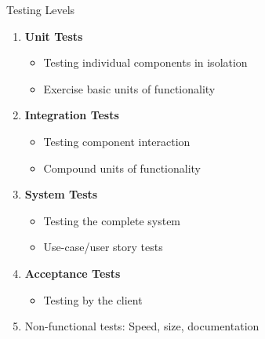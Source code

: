 \begin{frame}{Testing Levels}
	\begin{enumerate}
		\item \textbf{Unit Tests}
		\begin{itemize}
			\item Testing individual components in isolation
			\item Exercise basic units of functionality
		\end{itemize}
		
		\item \textbf{Integration Tests}
		\begin{itemize}
			\item Testing component interaction
			\item Compound units of functionality
		\end{itemize}
		
		\item \textbf{System Tests}
		\begin{itemize}
			\item Testing the complete system
			\item Use-case/user story tests
		\end{itemize}
		
		\item \textbf{Acceptance Tests}
		\begin{itemize}
			\item Testing by the client
		\end{itemize}
		
		\item Non-functional tests: Speed, size, documentation
	\end{enumerate}
\end{frame}

